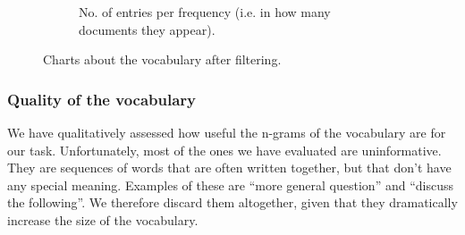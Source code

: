 \begin{figure}
\begin{subfigure}[t]{0.44\textwidth}
    \caption{No. of entries per frequency (i.e. in how many documents they appear).}
    \label{fig:vocab_after_freq}
  \end{subfigure}
  \caption{Charts about the vocabulary after filtering.}
\end{figure}

\subsubsection{Quality of the vocabulary}

We have qualitatively assessed how useful the n-grams of the vocabulary are for our task. Unfortunately, most of the ones we have evaluated are uninformative. They are sequences of words that are often written together, but that don't have any special meaning. Examples of these are ``more general question'' and ``discuss the following''. We therefore discard them altogether, given that they dramatically increase the size of the vocabulary.